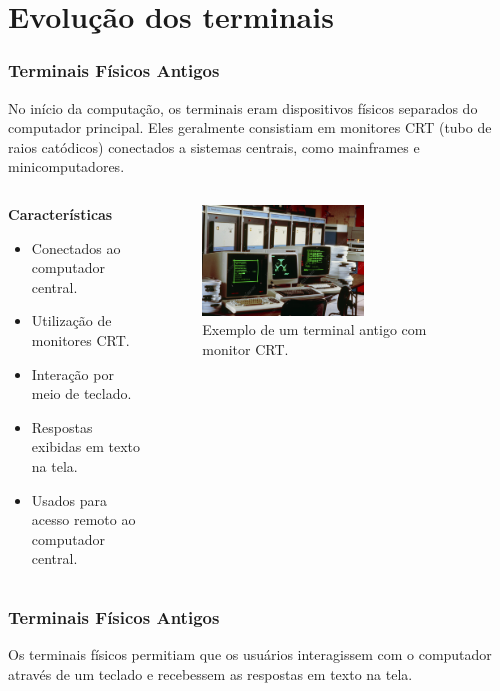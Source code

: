 \documentclass{beamer}
\begin{document}
\section{Evolução dos terminais}
\begin{frame}
      \frametitle{Terminais Físicos Antigos}
      
      No início da computação, os terminais eram dispositivos físicos separados do computador principal. Eles geralmente consistiam em monitores CRT (tubo de raios catódicos) conectados a sistemas centrais, como mainframes e minicomputadores.
      
      \begin{columns}
      \begin{column}{0.5\textwidth}
      \textbf{Características}
      \begin{itemize}
          \item Conectados ao computador central.
          \item Utilização de monitores CRT.
          \item Interação por meio de teclado.
          \item Respostas exibidas em texto na tela.
          \item Usados para acesso remoto ao computador central.
      \end{itemize}
      \end{column}
      
      \begin{column}{0.5\textwidth}
      \begin{figure}
          \centering
          \includegraphics[width=0.6\textwidth]{assets/aula-tads-pfds/terminal_antigo.jpg}
          \caption{Exemplo de um terminal antigo com monitor CRT.}
      \end{figure}
      \end{column}
      \end{columns}
      
      \end{frame}
      \begin{frame}\justifying
            \frametitle{Terminais Físicos Antigos}
            Os terminais físicos permitiam que os usuários interagissem com o computador através de um teclado e recebessem as respostas em texto na tela.

      \end{frame}
     
\end{document}
